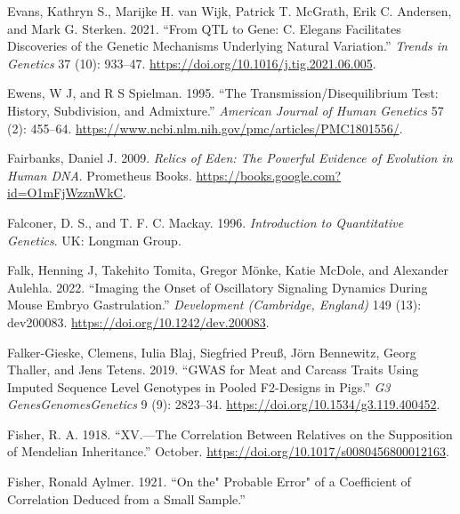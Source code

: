 \documentclass[
]{book}
\newlength{\cslhangindent}
\newlength{\cslentryspacingunit} %
\newenvironment{CSLReferences}[2] %
 {%
  \setlength{\parindent}{0pt}
  \ifodd #1
  \let\oldpar\par
  \def\par{\hangindent=\cslhangindent\oldpar}
  \fi
  \setlength{\parskip}{#2\cslentryspacingunit}
 }%
 {}
\begin{document}
\begin{CSLReferences}{1}{0}
\leavevmode{}%
Evans, Kathryn S., Marijke H. van Wijk, Patrick T. McGrath, Erik C. Andersen, and Mark G. Sterken. 2021. {``From {QTL} to Gene: {C}. Elegans Facilitates Discoveries of the Genetic Mechanisms Underlying Natural Variation.''} \emph{Trends in Genetics} 37 (10): 933--47. \url{https://doi.org/10.1016/j.tig.2021.06.005}.

\leavevmode{}%
Ewens, W J, and R S Spielman. 1995. {``The Transmission/Disequilibrium Test: History, Subdivision, and Admixture.''} \emph{American Journal of Human Genetics} 57 (2): 455--64. \url{https://www.ncbi.nlm.nih.gov/pmc/articles/PMC1801556/}.

\leavevmode{}%
Fairbanks, Daniel J. 2009. \emph{Relics of {Eden}: {The Powerful Evidence} of {Evolution} in {Human DNA}}. {Prometheus Books}. \url{https://books.google.com?id=O1mFjWzznWkC}.

\leavevmode{}%
Falconer, D. S., and T. F. C. Mackay. 1996. \emph{Introduction to Quantitative Genetics}. {UK: Longman Group}.

\leavevmode{}%
Falk, Henning J, Takehito Tomita, Gregor Mönke, Katie McDole, and Alexander Aulehla. 2022. {``Imaging the Onset of Oscillatory Signaling Dynamics During Mouse Embryo Gastrulation.''} \emph{Development (Cambridge, England)} 149 (13): dev200083. \url{https://doi.org/10.1242/dev.200083}.

\leavevmode{}%
Falker-Gieske, Clemens, Iulia Blaj, Siegfried Preuß, Jörn Bennewitz, Georg Thaller, and Jens Tetens. 2019. {``{GWAS} for {Meat} and {Carcass Traits Using Imputed Sequence Level Genotypes} in {Pooled F2-Designs} in {Pigs}.''} \emph{G3 Genes\textbar Genomes\textbar Genetics} 9 (9): 2823--34. \url{https://doi.org/10.1534/g3.119.400452}.

\leavevmode{}%
Fisher, R. A. 1918. {``{XV}.---{The Correlation} Between {Relatives} on the {Supposition} of {Mendelian Inheritance}.''} October. \url{https://doi.org/10.1017/s0080456800012163}.

\leavevmode{}%
Fisher, Ronald Aylmer. 1921. {``On the{"} {Probable Error}{"} of a {Coefficient} of {Correlation Deduced} from a {Small Sample}.''}


\end{CSLReferences}
\end{document}
